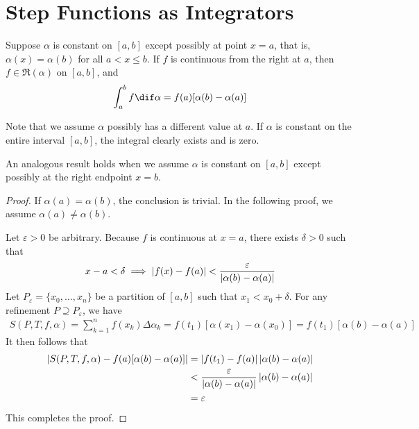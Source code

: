 \documentclass[thmcnt=section, color=blue, 12pt]{my-elegantbook}
\begin{document}
\section{Step Functions as Integrators}

\begin{proposition} \label{prop:6}
	Suppose $\alpha$ is constant on $[a, b]$ except possibly at point $x=a$,
	that is, $\alpha(x) = \alpha(b)$ for all $a < x \leq b$.
	If $f$ is continuous from the right at $a$,
	then $f \in \mathfrak{R}(\alpha)$ on $[a, b]$, and
	\begin{align*}
		\int_a^b f \dif \alpha = f(a)[\alpha(b) - \alpha(a)]
	\end{align*}
\end{proposition}

\begin{note}
	Note that we assume $\alpha$ possibly has a different value at $a$.
	If $\alpha$ is constant on the entire interval $[a, b]$,
	the integral clearly exists and is zero.

	An analogous result holds
	when we assume $\alpha$ is constant on $[a, b]$ except possibly
	at the right endpoint $x=b$.
\end{note}

\begin{proof}
	If $\alpha(a) = \alpha(b)$, the conclusion is trivial.
	In the following proof, we assume $\alpha(a) \neq \alpha(b)$.

	Let $\varepsilon > 0$ be arbitrary.
	Because $f$ is continuous at $x=a$, there exists $\delta > 0$ such that
	\begin{align*}
		x - a < \delta \implies \left\lvert f(x) - f(a) \right\rvert < \frac{\varepsilon}{\left\lvert \alpha(b) - \alpha(a) \right\rvert}
	\end{align*}
	Let $P_\varepsilon = \{x_0, \ldots, x_n\}$ be a partition of $[a, b]$
	such that $x_1 < x_0 + \delta$.
	For any refinement $P \supseteq P_\varepsilon$, we have
	\begin{align*}
		S(P, T, f, \alpha) = \sum_{k=1}^n f(x_k) \Delta \alpha_k
		= f(t_1) [\alpha(x_1) - \alpha(x_0)]
		= f(t_1) [\alpha(b) - \alpha(a)]
	\end{align*}
	It then follows that
	\begin{align*}
		\left\lvert S(P,T,f,\alpha) - f(a)[\alpha(b) - \alpha(a)] \right\rvert
		 & = \left\lvert f(t_1) - f(a) \right\rvert \left\lvert \alpha(b) - \alpha(a) \right\rvert                             \\
		 & < \frac{\varepsilon}{\left\lvert \alpha(b) - \alpha(a) \right\rvert} \left\lvert \alpha(b) - \alpha(a) \right\rvert \\
		 & =\varepsilon
	\end{align*}
	This completes the proof.
\end{proof}
\end{document}
